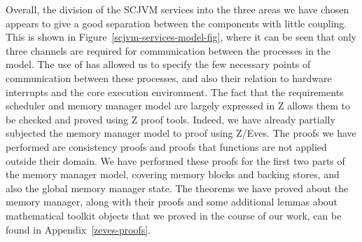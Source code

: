 Overall, the division of the SCJVM services into the three areas we
have chosen appears to give a good separation between the components
with little coupling.
This is shown in Figure~\ref{scjvm-services-model-fig}, where it can
be seen that only three channels are required for communication
between the processes in the model.
The use of \Circus{} has allowed us to specify the few necessary
points of communication between these processes, and also their
relation to hardware interrupts and the core execution environment.
The fact that the requirements scheduler and memory manager model are
largely expressed in Z allows them to be checked and proved using Z
proof tools.
Indeed, we have already partially subjected the memory manager model
to proof using Z/Eves.
The proofs we have performed are consistency proofs and proofs that
functions are not applied outside their domain.
We have performed these proofs for the first two parts of the memory
manager model, covering memory blocks and backing stores, and also the
global memory manager state.
The theorems we have proved about the memory manager, along with their
proofs and some additional lemmas about mathematical toolkit objects
that we proved in the course of our work, can be found in
Appendix~\ref{zeves-proofs}.


